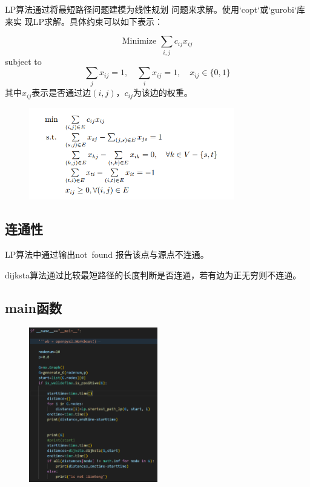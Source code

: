 \documentclass[10pt,a4paper,oneside]{article}
\begin{document}
LP算法通过将最短路径问题建模为线性规划
问题来求解。使用`copt`或`gurobi`库来实
现LP求解。具体约束可以如下表示：

\[
\text{Minimize } \sum_{i,j} c_{ij} x_{ij}
\]
subject to
\[
\sum_j x_{ij} = 1, \quad \sum_i x_{ij} = 1, \quad x_{ij} \in \{0, 1\}
\]
其中$x_{ij}$表示是否通过边$(i,j)$，$c_{ij}$为该边的权重。

\begin{figure}[H]
    \centering
    \includegraphics[width=0.8\textwidth]{图片1.png}
\end{figure}

\subsection{连通性}

LP算法中通过输出not\ found 报告该点与源点不连通。

dijksta算法通过比较最短路径的长度判断是否连通，若有边为正无穷则不连通。

\subsection{main函数}

\begin{figure}[H]
    \centering
    \includegraphics[width=0.5\textwidth]{屏幕截图 2024-10-18 133841.png}
\end{figure}
\end{document}
